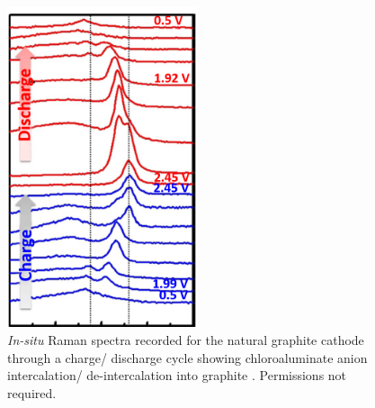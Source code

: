 \begin{figure}[tbh!]
\centering
\includegraphics[width=0.5\textwidth]{Figures/chap2fig/Raman2}
\caption{\textit{In-situ} Raman spectra recorded for the natural graphite cathode through a charge/ discharge cycle showing chloroaluminate anion intercalation/ de-intercalation into graphite \cite{wang_advanced_2017}. Permissions not required.}
\label{Figures/chap2fig:Raman2}
\end{figure}

